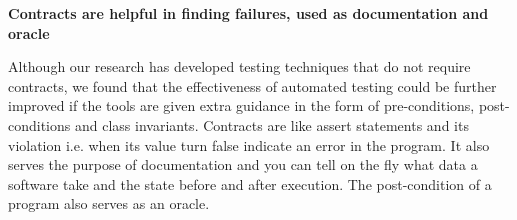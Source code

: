 \textbf{Contracts are helpful in finding failures, used as documentation and oracle}

Although our research has developed testing techniques that do not require contracts, we found that the effectiveness of automated testing could be further improved if the tools are given extra guidance in the form of pre-conditions, post-conditions and class invariants. Contracts are like assert statements and its violation i.e. when its value turn false indicate an error in the program. It also serves the purpose of documentation and you can tell on the fly what data a software take and the state before and after execution. The post-condition of a program also serves as an oracle.\\







